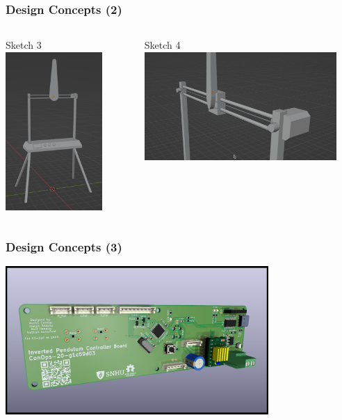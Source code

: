 \documentclass[aspectratio=169]{beamer}
\begin{document}
\begin{frame}
    \frametitle{Design Concepts (2)}

    \begin{columns}
        \begin{column}{0.48\textwidth}
            \begin{block}{Sketch 3}
                \includegraphics[height=6cm]{Full}
            \end{block}
        \end{column}

        \begin{column}{0.48\textwidth}
            \begin{block}{Sketch 4}
                \includegraphics[width=7.3cm]{UpperAssy}
            \end{block}
        \end{column}
    \end{columns}
\end{frame}

\begin{frame}
    \frametitle{Design Concepts (3)}

    \includegraphics[width=10cm]{CircuitBoard}
\end{frame}
\end{document}
